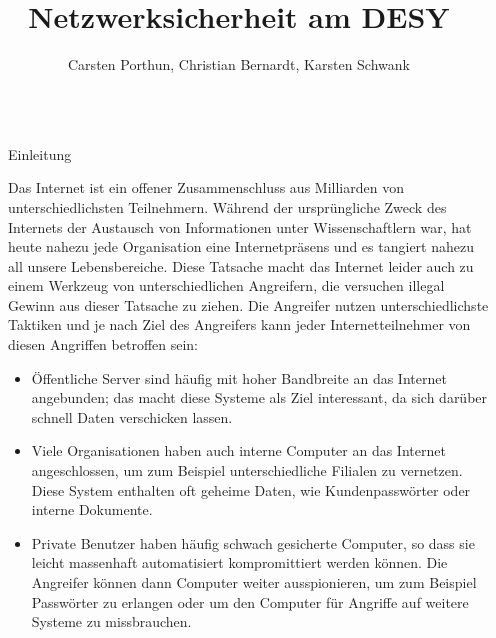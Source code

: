 \documentclass[final]{beamer}
\title{Netzwerksicherheit am DESY} %
\author{Carsten Porthun, Christian Bernardt, Karsten Schwank} %
\newlength{\sepwid}
\newlength{\twocolwid}
\begin{document}

\setlength{\belowcaptionskip}{2ex} %
\setlength\belowdisplayshortskip{2ex} %

\begin{frame}[t] %

\begin{columns}[t, totalwidth=\textwidth] %

\begin{column}{\sepwid}\end{column} %

\begin{column}{\twocolwid} %


\begin{block}{Einleitung}

Das Internet ist ein offener Zusammenschluss aus Milliarden von unterschiedlichsten
Teilnehmern. Während der ursprüngliche Zweck des Internets der Austausch von Informationen
unter Wissenschaftlern war, hat heute nahezu jede Organisation eine Internetpräsens und
es tangiert nahezu all unsere Lebensbereiche. Diese Tatsache macht das Internet leider auch
zu einem Werkzeug von unterschiedlichen Angreifern, die versuchen illegal Gewinn aus dieser
Tatsache zu ziehen.
Die Angreifer nutzen unterschiedlichste Taktiken und je nach Ziel des Angreifers kann jeder
Internetteilnehmer von diesen Angriffen betroffen sein:

\begin{itemize}
 \item Öffentliche Server sind häufig mit hoher Bandbreite an das Internet angebunden; das 
 macht diese Systeme als Ziel interessant, da sich darüber schnell Daten verschicken lassen.
 \item Viele Organisationen haben auch interne Computer an das Internet angeschlossen, um 
 zum Beispiel unterschiedliche Filialen zu vernetzen. Diese System enthalten oft geheime Daten, 
 wie Kundenpasswörter oder interne Dokumente.
 \item Private Benutzer haben häufig schwach gesicherte Computer, so dass sie leicht massenhaft
 automatisiert kompromittiert werden können. Die Angreifer können dann Computer weiter ausspionieren, 
 um zum Beispiel Passwörter zu erlangen oder um den Computer für Angriffe auf weitere Systeme 
 zu missbrauchen.
\end{itemize}


\end{block}
\end{column}
\end{columns}
\end{frame}
\end{document}

